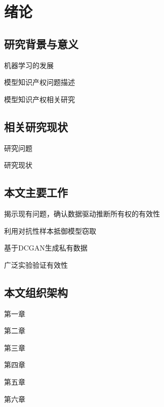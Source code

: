 
\chapter{绪论}
\label{1}


\section{研究背景与意义}

机器学习的发展

模型知识产权问题描述

模型知识产权相关研究

\section{相关研究现状}

研究问题

研究现状

\section{本文主要工作}

揭示\cite{maini2021dataset}现有问题，确认数据驱动推断所有权的有效性

利用对抗性样本抵御模型窃取

基于DCGAN生成私有数据

广泛实验验证有效性

\section{本文组织架构}

第一章

第二章

第三章

第四章

第五章

第六章